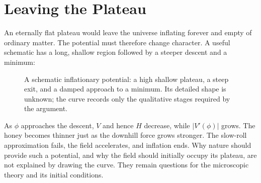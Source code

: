 \section{Leaving the Plateau}

An eternally flat plateau would leave the universe inflating forever and empty of ordinary matter. The potential must therefore change character. A useful schematic has a long, shallow region followed by a steeper descent and a minimum:
\begin{figure}[htbp]
\centering
\begin{coursefitfigure}
\end{coursefitfigure}
\caption{A schematic inflationary potential: a high shallow plateau, a steep exit, and a damped approach to a minimum. Its detailed shape is unknown; the curve records only the qualitative stages required by the argument.}
\label{fig:c09-inflation-potential}
\end{figure}

As \(\phi\) approaches the descent, \(V\) and hence \(H\) decrease, while \(\lvert V'(\phi)\rvert\) grows. The honey becomes thinner just as the downhill force grows stronger. The slow-roll approximation fails, the field accelerates, and inflation ends. Why nature should provide such a potential, and why the field should initially occupy its plateau, are not explained by drawing the curve. They remain questions for the microscopic theory and its initial conditions.

\begin{classroomqa}
\end{classroomqa}

